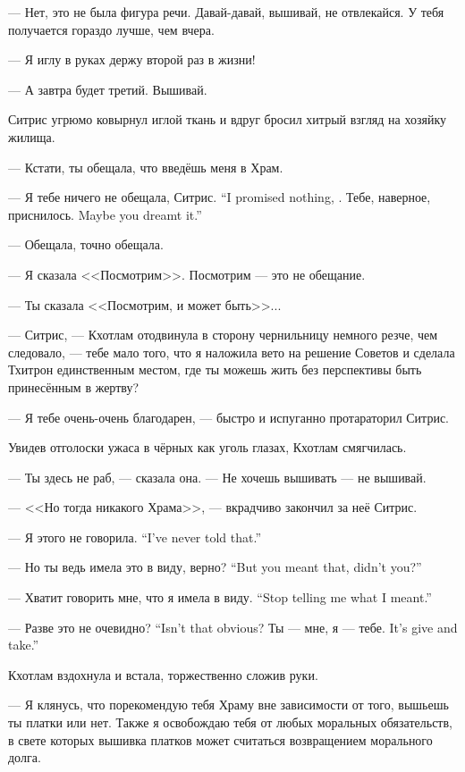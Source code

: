 --- Нет, это не была фигура речи.
Давай-давай, вышивай, не отвлекайся.
У тебя получается гораздо лучше, чем вчера.

--- Я иглу в руках держу второй раз в жизни!

--- А завтра будет третий.
Вышивай.

Ситрис угрюмо ковырнул иглой ткань и вдруг бросил хитрый взгляд на хозяйку жилища.

--- Кстати, ты обещала, что введёшь меня в Храм.

{--- Я тебе ничего не обещала, Ситрис.}
{``I promised nothing, \Sitris.}
{Тебе, наверное, приснилось.}
{Maybe you dreamt it.''}

--- Обещала, точно обещала.

--- Я сказала <<Посмотрим>>.
Посмотрим --- это не обещание.

--- Ты сказала <<Посмотрим, и может быть>>...

--- Ситрис, --- Кхотлам отодвинула в сторону чернильницу немного резче, чем следовало, --- тебе мало того, что я наложила вето на решение Советов и сделала Тхитрон единственным местом, где ты можешь жить без перспективы быть принесённым в жертву?

--- Я тебе очень-очень благодарен, --- быстро и испуганно протараторил Ситрис.

Увидев отголоски ужаса в чёрных как уголь глазах, Кхотлам смягчилась.

--- Ты здесь не раб, --- сказала она.
--- Не хочешь вышивать --- не вышивай.

--- <<Но тогда никакого Храма>>, --- вкрадчиво закончил за неё Ситрис.

{--- Я этого не говорила.}
{``I've never told that.''}

{--- Но ты ведь имела это в виду, верно?}
{``But you meant that, didn't you?''}

{--- Хватит говорить мне, что я имела в виду.}
{``Stop telling me what I meant.''}

{--- Разве это не очевидно?}
{``Isn't that obvious?}
{Ты --- мне, я --- тебе.}
{It's give and take.''}

Кхотлам вздохнула и встала, торжественно сложив руки.

--- Я клянусь, что порекомендую тебя Храму вне зависимости от того, вышьешь ты платки или нет.
Также я освобождаю тебя от любых моральных обязательств, в свете которых вышивка платков может считаться возвращением морального долга.

